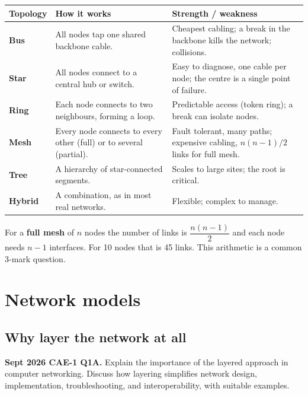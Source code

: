 \documentclass[11pt,a4paper]{article}
\begin{document}
\begin{center}\small
\begin{tabularx}{\textwidth}{>{\bfseries}p{} X p{}}
\toprule Topology & How it works & Strength / weakness\\
\midrule
Bus & All nodes tap one shared backbone cable. & Cheapest cabling; a break in the backbone kills the network; collisions.\\
Star & All nodes connect to a central hub or switch. & Easy to diagnose, one cable per node; the centre is a single point of failure.\\
Ring & Each node connects to two neighbours, forming a loop. & Predictable access (token ring); a break can isolate nodes.\\
Mesh & Every node connects to every other (full) or to several (partial). & Fault tolerant, many paths; expensive cabling, $n(n-1)/2$ links for full mesh.\\
Tree & A hierarchy of star-connected segments. & Scales to large sites; the root is critical.\\
Hybrid & A combination, as in most real networks. & Flexible; complex to manage.\\
\bottomrule
\end{tabularx}
\end{center}

\begin{rememberbox}
For a \textbf{full mesh} of $n$ nodes the number of links is $\dfrac{n(n-1)}{2}$ and each node needs $n-1$ interfaces. For 10 nodes that is 45 links. This arithmetic is a common 3-mark question.
\end{rememberbox}

\section{Network models}

\subsection{Why layer the network at all}

\begin{pyqbox}
\textbf{Sept 2026 CAE-1 Q1A.} Explain the importance of the layered approach in computer networking. Discuss how layering simplifies network design, implementation, troubleshooting, and interoperability, with suitable examples.
\end{pyqbox}
\end{document}
